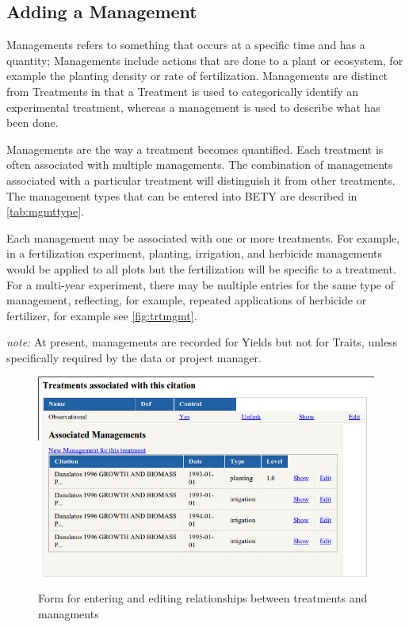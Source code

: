\documentclass[12pt,english,portrait]{article}
\begin{document}
\subsection{Adding a Management}\label{sec:addmanagement}

 Managements refers to something that occurs at a specific time and has a quantity; 
 Managements include actions that are done to a plant or ecosystem, for example the planting density or rate of fertilization.
 Managements are distinct from Treatments in that a Treatment is used to categorically identify an experimental treatment, whereas a management is used to describe what has been done.


Managements are the way a treatment becomes quantified.
Each treatment is often associated with multiple managements. 
The combination of managements associated with a particular treatment will distinguish it from other treatments.
The management types that can be entered into BETY are described in \autoref{tab:mgmttype}. 

Each management may be associated with one or more treatments. For example, in a fertilization experiment, planting, irrigation, and herbicide managements would be applied to all plots but the fertilization will be specific to a treatment.
For a multi-year experiment, there may be multiple entries for the same type of management, reflecting, for example, repeated applications of herbicide or fertilizer, for example see \autoref{fig:trtmgmt}.

\emph{note:}  At present, managements are recorded for Yields but not for Traits, unless specifically required by the data or project manager.

\begin{figure}
\caption{Form for entering and editing relationships between treatments and managments}
\label{fig:trtmgmt}
\includegraphics[width=5in]{figures/treatments_managements.png}
\end{figure}
\end{document}
